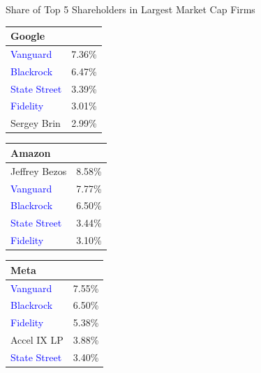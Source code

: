 \documentclass[english,aspectratio=169,handout]{beamer}
\theoremstyle{plain}
\begin{document}
\begin{frame}{Share of Top 5 Shareholders in Largest Market Cap Firms \hyperlink{intro}{}}
  \vspace{0.5cm} %

  \begin{minipage}[t]{0.3\textwidth} %
    \centering
    \footnotesize %
    \begin{tabular}{lr}
      \toprule
      Google                         &        \\
      \midrule
      \textcolor{blue}{Vanguard}     & 7.36\% \\
      \textcolor{blue}{Blackrock}    & 6.47\% \\
      \textcolor{blue}{State Street} & 3.39\% \\
      \textcolor{blue}{Fidelity}     & 3.01\% \\
      Sergey Brin                    & 2.99\% \\
      \bottomrule
    \end{tabular}
  \end{minipage}
  \hfill %
  \begin{minipage}[t]{0.3\textwidth} %
    \centering
    \footnotesize %
    \begin{tabular}{lr}
      \toprule
      Amazon                         &        \\
      \midrule
      Jeffrey Bezos                  & 8.58\% \\
      \textcolor{blue}{Vanguard}     & 7.77\% \\
      \textcolor{blue}{Blackrock}    & 6.50\% \\
      \textcolor{blue}{State Street} & 3.44\% \\
      \textcolor{blue}{Fidelity}     & 3.10\% \\
      \bottomrule
    \end{tabular}
  \end{minipage}
  \hfill %
  \begin{minipage}[t]{0.3\textwidth} %
    \centering
    \footnotesize %
    \begin{tabular}{lr}
      \toprule
      Meta                           &        \\
      \midrule
      \textcolor{blue}{Vanguard}     & 7.55\% \\
      \textcolor{blue}{Blackrock}    & 6.50\% \\
      \textcolor{blue}{Fidelity}     & 5.38\% \\
      Accel IX LP                    & 3.88\% \\
      \textcolor{blue}{State Street} & 3.40\% \\
      \bottomrule
    \end{tabular}
  \end{minipage}

\end{frame}
\end{document}
